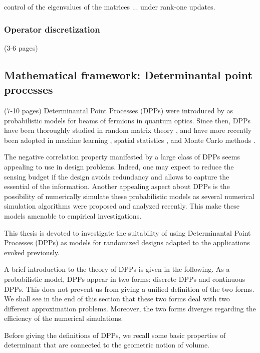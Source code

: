\documentclass[twoside,11pt]{book}
\begin{document}
control of the eigenvalues of the matrices ... under rank-one updates.


\subsubsection{Operator discretization}
(3-6 pages)
\subsection{Mathematical framework: Determinantal point processes}
(7-10 pages)
  Determinantal Point Processes (DPPs) were introduced by \cite{Mac75} as probabilistic models for beams of fermions in quantum optics. Since then, DPPs have been thoroughly studied in random matrix theory \citep{Joh05}, and have more recently been adopted in machine learning \citep*{KuTa12}, spatial statistics \citep*{LaMoRu15}, and Monte Carlo methods \citep{BaHa16}.

The negative correlation property manifested by a large class of DPPs seems appealing to use in design problems. Indeed, one may expect to reduce the sensing budget if the design avoids redundancy and allows to capture the essential of the information. 
Another appealing aspect about DPPs is the possibility of numerically simulate these probabilistic models as several numerical simulation algorithms were proposed and analyzed recently. This make these models amenable to empirical investigations.
 

This thesis is devoted to investigate the suitability of using Determinantal Point Processes (DPPs) as models for randomized designs adapted to the applications evoked previously.

A brief introduction to the theory of DPPs is given in the following. As a probabilistic model, DPPs appear in two forms: discrete DPPs and continuous DPPs. This does not prevent us from giving a unified definition of the two forms. We shall see in the end of this section that these two forms deal with two different approximation problems. Moreover, the two forms diverges regarding the efficiency of the numerical simulations.

Before giving the definitions of DPPs, we recall some basic properties of determinant that are connected to the geometric notion of volume.
\end{document}
